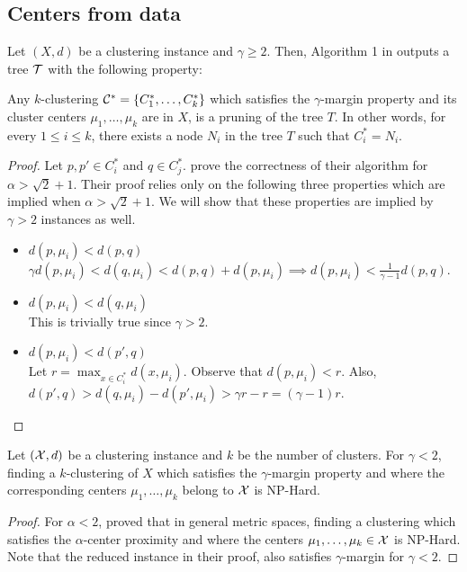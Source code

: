 \subsection{Centers from data}
\begin{theorem}
\label{thm:upperCenterData}
Let $(X , d)$ be a clustering instance and $\gamma \ge 2$. Then, Algorithm 1 in \cite{balcan2012clustering} outputs a tree $\mathcal T$ with the following property: 


Any $k$-clustering $\mathcal C^* = \{C_1^*, \ldots, C_k^* \}$ which satisfies the $\gamma$-margin property and its cluster centers $\mu_1, \ldots, \mu_k$ are in $X$, is a pruning of the tree $T$. In other words, for every $1 \le i \le k$, there exists a node $N_i$ in the tree $T$ such that $C_i^* = N_i$.
\end{theorem}

\begin{proof}
Let $p, p' \in C_i^*$ and $q \in C_j^*$. \cite{balcan2012clustering} prove the correctness of their algorithm for $\alpha > \sqrt{2} + 1$. Their proof relies only on the following three properties which are implied when $\alpha > \sqrt{2} + 1$. We will show that these properties are implied by $\gamma > 2$ instances as well.
\begin{itemize}[nolistsep,noitemsep]
\item $d(p, \mu_i) < d(p, q)$\\
$\gamma d(p, \mu_i) < d(q, \mu_i) < d(p, q) + d(p, \mu_i) \implies d(p, \mu_i) < \frac{1}{\gamma-1}d(p, q)$.
\item $d(p, \mu_i) < d(q, \mu_i)$\\
This is trivially true since $\gamma > 2$.
\item $d(p, \mu_i) < d(p', q)$\\
Let $r = \max_{x \in C_i^*} d(x, \mu_i)$. Observe that $d(p, \mu_i) < r$. Also, $d(p', q)> d(q, \mu_i)-d(p', \mu_i) > \gamma r - r = (\gamma -1)r$.
\end{itemize}
\end{proof}

\begin{theorem}
\label{thm:lowerCenterData}
Let $(\mathcal X, d)$ be a clustering instance and $k$ be the number of clusters. For $\gamma < 2$, finding a $k$-clustering of $X$ which satisfies the $\gamma$-margin property and where the corresponding centers $\mu_1, \ldots, \mu_k$ belong to $\mathcal X$ is NP-Hard.
\end{theorem}
\begin{proof}
For $\alpha < 2$, \cite{ben2014data} proved that in general metric spaces, finding a clustering which satisfies the $\alpha$-center proximity and where the centers $\mu_1, \ldots, \mu_k \in \mathcal X$ is NP-Hard. Note that the reduced instance in their proof, also satisfies $\gamma$-margin for $\gamma < 2$. 
\end{proof}

